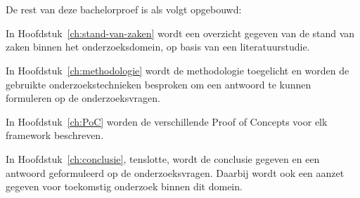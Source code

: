 \section{}%
\label{sec:opzet-bachelorproef}


De rest van deze bachelorproef is als volgt opgebouwd:

In Hoofdstuk~\ref{ch:stand-van-zaken} wordt een overzicht gegeven van de stand van zaken binnen het onderzoeksdomein, op basis van een literatuurstudie.

In Hoofdstuk~\ref{ch:methodologie} wordt de methodologie toegelicht en worden de gebruikte onderzoekstechnieken besproken om een antwoord te kunnen formuleren op de onderzoeksvragen.

In Hoofdstuk~\ref{ch:PoC} worden de verschillende Proof of Concepts voor elk framework beschreven.

In Hoofdstuk~\ref{ch:conclusie}, tenslotte, wordt de conclusie gegeven en een antwoord geformuleerd op de onderzoeksvragen. Daarbij wordt ook een aanzet gegeven voor toekomstig onderzoek binnen dit domein.